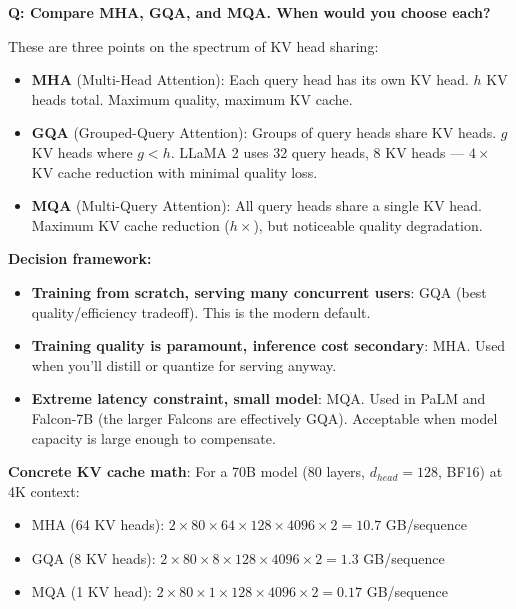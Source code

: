 \begin{interviewq}
\textbf{Q: Compare MHA, GQA, and MQA. When would you choose each?}

 \quad {} \quad \badgefreq{\freqhigh}

\stronganswer These are three points on the spectrum of KV head sharing:

\begin{itemize}
    \item \textbf{MHA} (Multi-Head Attention): Each query head has its own KV head. $h$ KV heads total. Maximum quality, maximum KV cache.
    \item \textbf{GQA} (Grouped-Query Attention): Groups of query heads share KV heads. $g$ KV heads where $g < h$. LLaMA 2 uses 32 query heads, 8 KV heads --- $4\times$ KV cache reduction with minimal quality loss.
    \item \textbf{MQA} (Multi-Query Attention): All query heads share a single KV head. Maximum KV cache reduction ($h\times$), but noticeable quality degradation.
\end{itemize}

\textbf{Decision framework:}
\begin{itemize}
    \item \textbf{Training from scratch, serving many concurrent users}: GQA (best quality/efficiency tradeoff). This is the modern default.
    \item \textbf{Training quality is paramount, inference cost secondary}: MHA. Used when you'll distill or quantize for serving anyway.
    \item \textbf{Extreme latency constraint, small model}: MQA. Used in PaLM and Falcon-7B (the larger Falcons are effectively GQA). Acceptable when model capacity is large enough to compensate.
\end{itemize}

\textbf{Concrete KV cache math}: For a 70B model (80 layers, $d_{head}=128$, BF16) at 4K context:
\begin{itemize}
    \item MHA (64 KV heads): $2 \times 80 \times 64 \times 128 \times 4096 \times 2 = 10.7$ GB/sequence
    \item GQA (8 KV heads): $2 \times 80 \times 8 \times 128 \times 4096 \times 2 = 1.3$ GB/sequence
    \item MQA (1 KV head): $2 \times 80 \times 1 \times 128 \times 4096 \times 2 = 0.17$ GB/sequence
\end{itemize}


\end{interviewq}
